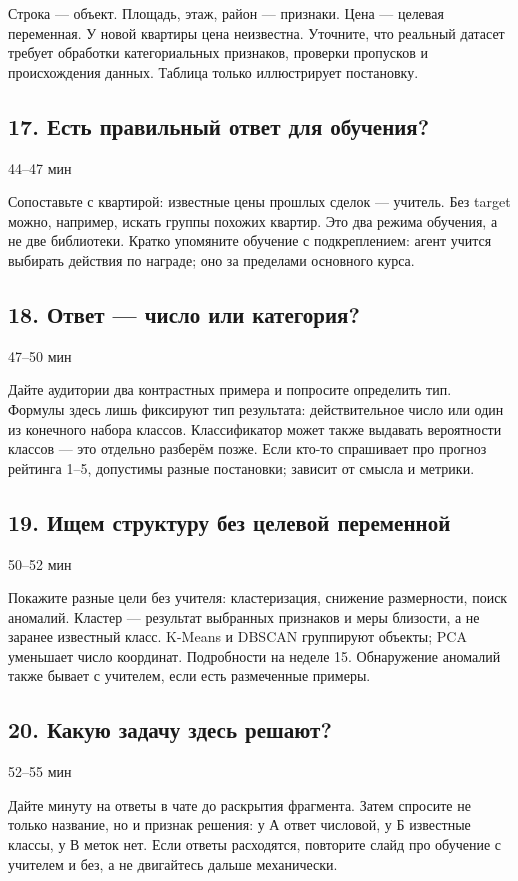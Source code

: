\documentclass[11pt,a4paper]{article}
\newcommand{\timing}[1]{\hfill{\small\color{blue}#1}}
\begin{document}
Строка — объект. Площадь, этаж, район — признаки. Цена — целевая переменная. У новой квартиры цена неизвестна. Уточните, что реальный датасет требует обработки категориальных признаков, проверки пропусков и происхождения данных. Таблица только иллюстрирует постановку.

\subsection{17. Есть правильный ответ для обучения?}
\timing{44–47 мин}

Сопоставьте с квартирой: известные цены прошлых сделок — учитель. Без target можно, например, искать группы похожих квартир. Это два режима обучения, а не две библиотеки. Кратко упомяните обучение с подкреплением: агент учится выбирать действия по награде; оно за пределами основного курса.

\subsection{18. Ответ — число или категория?}
\timing{47–50 мин}

Дайте аудитории два контрастных примера и попросите определить тип. Формулы здесь лишь фиксируют тип результата: действительное число или один из конечного набора классов. Классификатор может также выдавать вероятности классов — это отдельно разберём позже. Если кто-то спрашивает про прогноз рейтинга 1–5, допустимы разные постановки; зависит от смысла и метрики.

\subsection{19. Ищем структуру без целевой переменной}
\timing{50–52 мин}

Покажите разные цели без учителя: кластеризация, снижение размерности, поиск аномалий. Кластер — результат выбранных признаков и меры близости, а не заранее известный класс. K-Means и DBSCAN группируют объекты; PCA уменьшает число координат. Подробности на неделе 15. Обнаружение аномалий также бывает с учителем, если есть размеченные примеры.

\subsection{20. Какую задачу здесь решают?}
\timing{52–55 мин}

Дайте минуту на ответы в чате до раскрытия фрагмента. Затем спросите не только название, но и признак решения: у А ответ числовой, у Б известные классы, у В меток нет. Если ответы расходятся, повторите слайд про обучение с учителем и без, а не двигайтесь дальше механически.
\end{document}
